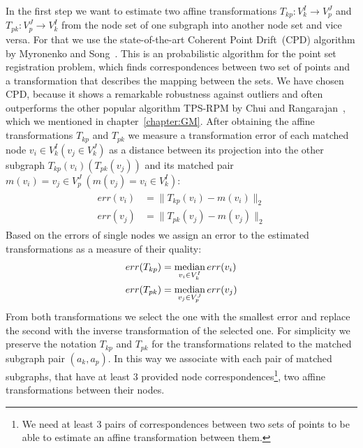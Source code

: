 In the first step we want to estimate two affine transformations $T_{kp}:V^I_k\rightarrow V^J_p$ and $T_{pk}:V^J_p\rightarrow V^I_k$ from the node set of one subgraph into another node set and vice versa. For that we use the state-of-the-art Coherent Point Drift~(CPD) algorithm by Myronenko and Song~\cite{Myronenko2009_CPD}. This is an probabilistic algorithm for the point set registration problem, which finds correspondences between two set of points and a transformation that describes the mapping between the sets. We have chosen CPD, because it shows a remarkable robustness against outliers and often outperforms the other popular algorithm TPS-RPM by Chui and Rangarajan~\cite{Chui2003}, which we mentioned in chapter~\ref{chapter:GM}. After obtaining the affine transformations $T_{kp}$ and $T_{pk}$ we measure a transformation error of each matched node $v_i\in V^I_k (v_j\in V^J_k)$ as a distance between its projection into the other subgraph $T_{kp}(v_i) (T_{pk}(v_j))$ and its matched pair $m(v_i) = v_j\in V^J_p\ (m(v_j) = v_i\in V^I_k)$:
\begin{align}\begin{split} \label{eq:err_v}
err(v_i) &= \|T_{kp}(v_i) - m(v_i)\|_{2}\\
err(v_j) &= \|T_{pk}(v_j) - m(v_j)\|_{2}
\end{split}\end{align}
Based on the errors of single nodes we assign an error to the estimated transformations as a measure of their quality:
\begin{equation}\begin{split} \label{eq:err_T}
err(T_{kp}) & = \mathop{\rm median}_{v_i\in V^I_k}err(v_i) \\
err(T_{pk}) & = \mathop{\rm median}_{v_j\in V^J_p}err(v_j)
\end{split}\end{equation}
From both transformations we select the one with the smallest error and replace the second with the inverse transformation of the selected one. For simplicity we preserve the notation $T_{kp}$ and $T_{pk}$ for the transformations related to the matched subgraph pair $(a_k, a_p)$. In this way we associate with each pair of matched subgraphs, that have at least $3$ provided node correspondences\footnote{We need at least $3$ pairs of correspondences between two sets of points to be able to estimate an affine transformation between them.}, two affine transformations between their nodes.

